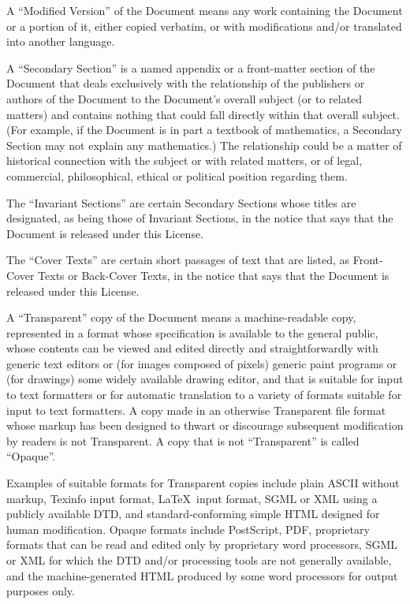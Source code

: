 \documentclass[a4paper]{report}
\begin{document}
A ``Modified Version'' of the Document means any work containing the
Document or a portion of it, either copied verbatim, or with
modifications and/or translated into another language.

A ``Secondary Section'' is a named appendix or a front-matter section of
the Document that deals exclusively with the relationship of the
publishers or authors of the Document to the Document's overall subject
(or to related matters) and contains nothing that could fall directly
within that overall subject.  (For example, if the Document is in part a
textbook of mathematics, a Secondary Section may not explain any
mathematics.)  The relationship could be a matter of historical
connection with the subject or with related matters, or of legal,
commercial, philosophical, ethical or political position regarding
them.

The ``Invariant Sections'' are certain Secondary Sections whose titles
are designated, as being those of Invariant Sections, in the notice
that says that the Document is released under this License.

The ``Cover Texts'' are certain short passages of text that are listed,
as Front-Cover Texts or Back-Cover Texts, in the notice that says that
the Document is released under this License.

A ``Transparent'' copy of the Document means a machine-readable copy,
represented in a format whose specification is available to the
general public, whose contents can be viewed and edited directly and
straightforwardly with generic text editors or (for images composed of
pixels) generic paint programs or (for drawings) some widely available
drawing editor, and that is suitable for input to text formatters or
for automatic translation to a variety of formats suitable for input
to text formatters.  A copy made in an otherwise Transparent file
format whose markup has been designed to thwart or discourage
subsequent modification by readers is not Transparent.  A copy that is
not ``Transparent'' is called ``Opaque''.

Examples of suitable formats for Transparent copies include plain
ASCII without markup, Texinfo input format, \LaTeX~input format, SGML
or XML using a publicly available DTD, and standard-conforming simple
HTML designed for human modification.  Opaque formats include
PostScript, PDF, proprietary formats that can be read and edited only
by proprietary word processors, SGML or XML for which the DTD and/or
processing tools are not generally available, and the
machine-generated HTML produced by some word processors for output
purposes only.
\end{document}
